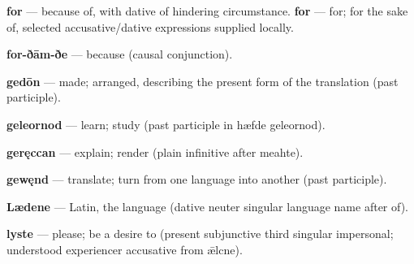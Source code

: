 \textbf{for} — because of, with dative of hindering circumstance. \textbf{for} — for; for the sake of, selected accusative/\allowbreak{}dative expressions supplied locally.

\textbf{for-ðām-ðe} — because (causal conjunction).

\textbf{gedōn} — made; arranged, describing the present form of the translation (past participle).

\textbf{geleornod} — learn; study (past participle in hæfde geleornod).

\textbf{geręccan} — explain; render (plain infinitive after meahte).

\textbf{gewęnd} — translate; turn from one language into another (past participle).

\textbf{Lædene} — Latin, the language (dative neuter singular language name after of).

\textbf{lyste} — please; be a desire to (present subjunctive third singular impersonal; understood experiencer accusative from ǣlcne).

